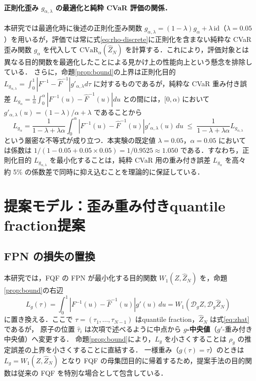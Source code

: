 \documentclass[a4paper,10pt]{jsarticle}
\theoremstyle{definition}
\newcommand{\CVaR}{\mathrm{CVaR}}
\newcommand{\Wone}{W_1}
\newcommand{\Finv}{F^{-1}}
\newcommand{\Fhinv}{\hat{F}^{-1}}
\newcommand{\dist}{\mathcal{D}_g}
\begin{document}
\paragraph{正則化歪み $g_{\alpha,\lambda}$ の最適化と純粋 CVaR 評価の関係．}
本研究では最適化時に後述の正則化歪み関数 $g_{\alpha,\lambda}=(1-\lambda)g_\alpha+\lambda\,\mathrm{id}$（$\lambda=0.05$）を用いるが，評価では常に式\eqref{eq:rho-discrete}に正則化を含まない純粋な CVaR 歪み関数 $g_\alpha$ を代入して $\CVaR_\alpha(\hat Z_N)$ を計算する．これにより，評価対象とは異なる目的関数を最適化したことによる見かけ上の性能向上という懸念を排除している．
さらに，命題\ref{prop:bound}の上界は正則化目的 $L_{g_{\alpha,\lambda}}=\int_0^1|\Finv-\Fhinv|g'_{\alpha,\lambda}d\tau$ に対するものであるが，純粋な CVaR 重み付き誤差 $L_{g_\alpha}=\frac1\alpha\int_0^\alpha|\Finv(u)-\Fhinv(u)|du$ との間には，$[0,\alpha)$ において $g'_{\alpha,\lambda}(u)=(1-\lambda)/\alpha+\lambda$ であることから
\begin{equation}
  L_{g_\alpha}=\frac{1}{1-\lambda+\lambda\alpha}\int_0^\alpha|\Finv(u)-\Fhinv(u)|g'_{\alpha,\lambda}(u)\,du
  \;\le\; \frac{1}{1-\lambda+\lambda\alpha} L_{g_{\alpha,\lambda}}
  \label{eq:reg-bound-relation}
\end{equation}
という厳密な不等式が成り立つ．本実験の既定値 $\lambda=0.05$，$\alpha=0.05$ においては係数は $1/(1-0.05+0.05\times0.05)=1/0.9525\approx1.050$ である．すなわち，正則化目的 $L_{g_{\alpha,\lambda}}$ を最小化することは，純粋 CVaR 用の重み付き誤差 $L_{g_\alpha}$ を高々約 5\% の係数差で同時に抑え込むことを理論的に保証している．

\section{提案モデル：歪み重み付きquantile fraction提案}
\label{sec:proposed}

\subsection{FPN の損失の置換}
本研究では，FQF の FPN が最小化する目的関数
$\Wone(Z,\hat Z_N)$ を，命題\ref{prop:bound}の右辺
\begin{equation}
  L_g(\tau)=\int_0^1\left|\Finv(u)-\Fhinv(u)\right|g'(u)\,du=\Wone(\dist Z,\dist\hat Z_N)
  \label{eq:Lg}
\end{equation}
に置き換える．ここで $\tau=(\tau_1,\dots,\tau_{N-1})$ はquantile fraction，$\hat Z_N$ は式\eqref{eq:zhat}であるが，
原子の位置 $\hat\tau_i$ は次項で述べるように中点から \textbf{$g$-中央値}（$g'$-重み付き中央値）へ変更する．
命題\ref{prop:bound}により，$L_g$ を小さくすることは $\rho_g$ の推定誤差の上界を小さくすることに直結する．
一様重み（$g(\tau)=\tau$）のときは $L_g=\Wone(Z,\hat Z_N)$ となり FQF の母集団目的に帰着するため，提案手法の目的関数は従来の FQF を特別な場合として包含している．
\end{document}
